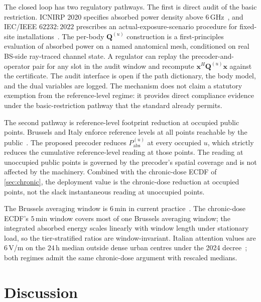 \documentclass[journal,twocolumn,10pt]{IEEEtran}
\theoremstyle{plain}
\theoremstyle{remark}
\newcommand{\xx}{\mathbf{x}}
\newcommand{\Pabs}{P_{\mathrm{abs}}}
\newcommand{\Qmat}{\mathbf{Q}}
\begin{document}
The closed loop has two regulatory pathways. The first is direct
audit of the basic restriction. ICNIRP 2020 specifies absorbed
power density above $6\,$GHz~\cite{ICNIRP2020}, and IEC/IEEE
$62232:2022$ prescribes an actual-exposure-scenario procedure for
fixed-site installations~\cite{IEC62232}. The per-body
$\Qmat^{(u)}$ construction is a first-principles evaluation of
absorbed power on a named anatomical mesh, conditioned on real
BS-side ray-traced channel state. A regulator can replay the
precoder-and-operator pair for any slot in the audit window and
recompute $\xx^H \Qmat^{(u)} \xx$ against the certificate. The
audit interface is open if the path dictionary, the body model, and
the dual variables are logged. The mechanism does not claim a
statutory exemption from the reference-level regime: it provides
direct compliance evidence under the basic-restriction pathway that
the standard already permits.

The second pathway is reference-level footprint reduction at
occupied public points. Brussels and Italy enforce reference levels
at all points reachable by the public~\cite{BrusselsArrete2007,ItalyDL}.
The proposed precoder reduces $\Pabs^{(u)}$ at every occupied $u$,
which strictly reduces the cumulative reference-level reading at
those points. The reading at unoccupied public points is governed by
the precoder's spatial coverage and is not affected by the
machinery. Combined with the chronic-dose ECDF of \cref{sec:chronic},
the deployment value is the chronic-dose reduction at occupied
points, not the slack instantaneous reading at unoccupied points.

The Brussels averaging window is $6\,$min in current
practice~\cite{BrusselsArrete2024}. The chronic-dose ECDF's
$5\,$min window covers most of one Brussels averaging window;
the integrated absorbed energy scales linearly with window length
under stationary load, so the tier-stratified ratios are
window-invariant. Italian attention values are $6\,$V/m on the
$24\,$h median outside dense urban centres under the 2024
decree~\cite{ItalyDL}; both regimes admit the same chronic-dose
argument with rescaled medians.


\section{Discussion}\label{sec:discussion}
\end{document}
